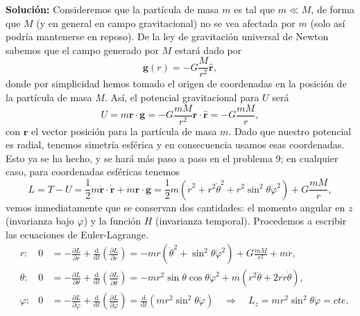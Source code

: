 \documentclass{article}
\begin{document}
\textcolor{Cinnabar}{\textbf{Soluci\'on:}} Consideremos que la part\'icula de masa $m$ es tal que $m \ll M$, de forma que $M$ (y en general en campo gravitacional) no se vea afectada por $m$ (solo as\'i podr\'ia mantenerse en reposo). De la ley de gravitaci\'on universal de Newton sabemos que el campo generado por $M$ estar\'a dado por
\begin{equation}
    \mathbf{g}(r) = -G\frac{M}{r^2}\mathbf{\hat{r}},
\end{equation}
donde por simplicidad hemos tomado el origen de coordenadas en la posici\'on de la part\'icula de masa $M$. As\'i, el potencial gravitacional para $U$ ser\'a
\begin{equation}
    U = m\mathbf{r}\cdot\mathbf{g} = -G\frac{mM}{r^2}\mathbf{r}\cdot\mathbf{\hat{r}} = -G\frac{mM}{r},
\end{equation}
con $\mathbf{r}$ el vector posici\'on para la part\'icula de masa $m$. Dado que nuestro potencial es radial, tenemos simetr\'ia esf\'erica y en consecuencia usamos esas coordenadas. Esto ya se ha hecho, y se har\'a m\'as paso a paso en el problema 9; en cualquier caso, para coordenadas esf\'ericas tenemos
\begin{equation}
    L = T-U = \frac{1}{2}m\mathbf{\dot{r}}\cdot\mathbf{\dot{r}} + m\mathbf{r}\cdot\mathbf{g} 
    = \frac{1}{2}m(\dot{r}^2+r^2\dot{\theta}^2+r^2\sin^2\theta\dot{\varphi}^2) + G\frac{mM}{r},
\end{equation}
vemos inmediatamente que se conservan dos cantidades: el momento angular en $z$ (invarianza bajo $\varphi$) y la funci\'on $H$ (invarianza temporal). Procedemos a escribir las ecuaciones de Euler-Lagrange.
\begin{align}
    &r:& 0&=-\frac{\partial L}{\partial r}+\frac{\mathrm{d}}{\mathrm{d}t}\left(\frac{\partial L}{\partial\dot{r}}\right) = -mr(\dot{\theta}^2+\sin^2\theta\dot{\varphi}^2) + G\frac{mM}{r^2} + m\ddot{r}, \label{Pr7:EL-r}\\
    &\theta:& 0&=-\frac{\partial L}{\partial \theta}+\frac{\mathrm{d}}{\mathrm{d}t}\left(\frac{\partial L}{\partial\dot{\theta}}\right) = -mr^2\sin\theta\cos\theta\dot{\varphi}^2 + m(r^2\ddot{\theta}+2r\dot{r}\dot{\theta}), \label{Pr7:EL-th}\\
    &\varphi:& 0&=-\frac{\partial L}{\partial \varphi}+\frac{\mathrm{d}}{\mathrm{d}t}\left(\frac{\partial L}{\partial\dot{\varphi}}\right) = \frac{\mathrm{d}}{\mathrm{d}t}(mr^2\sin^2\theta \dot{\varphi}) \quad\Rightarrow\quad L_z=mr^2\sin^2\theta\dot{\varphi}=cte. \label{Pr7:EL-ph}
\end{align}
\end{document}
